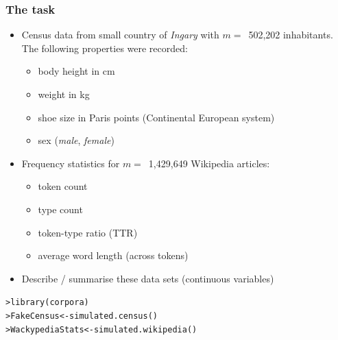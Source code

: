 \documentclass[t]{beamer} %
\begin{document}
\begin{frame}[fragile]
  \frametitle{The task}

  \begin{itemize}
  \item Census data from small country of \emph{Ingary} with $m =$~502,202
    inhabitants.  The following properties were recorded:
    \begin{itemize}
    \item body height in cm
    \item weight in kg
    \item shoe size in Paris points (Continental European system)
    \item sex (\emph{male}, \emph{female})
    \end{itemize}
  \item Frequency statistics for $m =$~1,429,649 Wikipedia articles:
    \begin{itemize}
    \item token count
    \item type count
    \item token-type ratio (TTR)
    \item average word length (across tokens)
    \end{itemize}
  \item[\hand] Describe / summarise these data sets (continuous variables)
  \end{itemize}

  \pause
  \begin{alltt}\small
    > library(corpora)
    > FakeCensus <- simulated.census()
    > WackypediaStats <- simulated.wikipedia()
  \end{alltt}
\end{frame}

\end{document}
